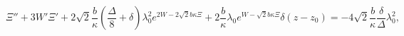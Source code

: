 \begin{equation}
\Xi'' + 3 W' \Xi' + 2 \sqrt{2} \frac{b}{\kappa} 
\left( \frac{\Delta}{8} + \delta \right) \lambda_{0}^{2} e^{2W - 2 \sqrt{2} b \kappa \Xi} 
+ 2 \frac{b}{\kappa} \lambda_{0}  e^{W - \sqrt{2} b \kappa \Xi}  \delta(z - z_{0}) 
= -4 \sqrt{2} \frac{b}{\kappa} \frac{\delta}{\Delta} \lambda_0^2,
\label{eq:EOMz}
\end{equation}

